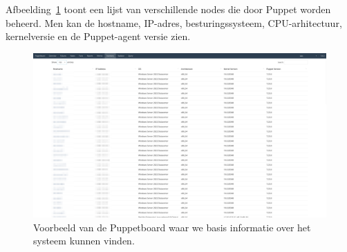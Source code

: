 Afbeelding~\ref{fig:puppetboard-example-4} toont een lijst van verschillende nodes die door Puppet worden beheerd.
Men kan de hostname, IP-adres, besturingssysteem, CPU-arhitectuur, kernelversie en de Puppet-agent versie zien.

\begin{figure}[h!]
    \includegraphics[width=\textwidth]
    {./graphics/state-of-the-art/puppetboard/puppetboard-inventory.png}
    \caption{\label{fig:puppetboard-example-4}Voorbeeld van de Puppetboard waar we basis informatie over het systeem kunnen vinden.}
\end{figure}
